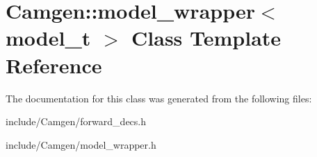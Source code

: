 \hypertarget{a00373}{}\section{Camgen\+:\+:model\+\_\+wrapper$<$ model\+\_\+t $>$ Class Template Reference}
\label{a00373}


The documentation for this class was generated from the following files\+:\begin{DoxyCompactItemize}
\item 
include/\+Camgen/forward\+\_\+decs.\+h\item 
include/\+Camgen/model\+\_\+wrapper.\+h\end{DoxyCompactItemize}
